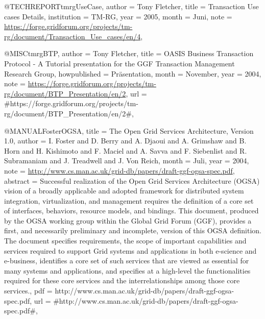 @TECHREPORT{tmrgUseCase,
  author = {Tony Fletcher},
  title = {{Transaction Use cases Details}},
  institution = {TM-RG},
  year = {2005},
  month = {Juni},
  note = {\url{https://forge.gridforum.org/projects/tm-rg/document/Transaction_Use_cases/en/4}},
}

@MISC{tmrgBTP,
  author = {Tony Fletcher},
  title = {{OASIS Business Transaction Protocol - A Tutorial presentation for
	the GGF Transaction Management Research Group}},
  howpublished = {Präsentation},
  month = {November},
  year = {2004},
  note = {\url{https://forge.gridforum.org/projects/tm-rg/document/BTP_Presentation/en/2}},
  url = {#https://forge.gridforum.org/projects/tm-rg/document/BTP_Presentation/en/2#},
}

@MANUAL{FosterOGSA,
  title = {{The Open Grid Services Architecture, Version 1.0}},
  author = {I. Foster and D. Berry and A. Djaoui and A. Grimshaw and B. Horn
	and H. Kishimoto and F. Maciel and A. Savva and F. Siebenlist and
	R. Subramaniam and J. Treadwell and J. Von Reich},
  month = {Juli},
  year = {2004},
  note = {\url{http://www.cs.man.ac.uk/grid-db/papers/draft-ggf-ogsa-spec.pdf}},
  abstract = {Successful realization of the Open Grid Services
Architecture (OGSA)
	vision of a broadly applicable and adopted framework
for distributed
	system integration, virtualization, and management
requires the definition
	of a core set of interfaces, behaviors, resource
models, and bindings.
	This document, produced by the OGSA working group
within the Global
	Grid Forum (GGF), provides a first, and necessarily
preliminary and
	incomplete, version of this OGSA definition. The
document specifies
	requirements, the scope of important capabilities and
services required
	to support Grid systems and applications in both
e-science and e-business,
	identifies a core set of such services
that are viewed as essential
	for many systems and applications, and
specifies at a high-level
	the functionalities required for these
core services and the interrelationships
	among those core services.},
  pdf = {http://www.cs.man.ac.uk/grid-db/papers/draft-ggf-ogsa-spec.pdf},
  url = {#http://www.cs.man.ac.uk/grid-db/papers/draft-ggf-ogsa-spec.pdf#},
}

